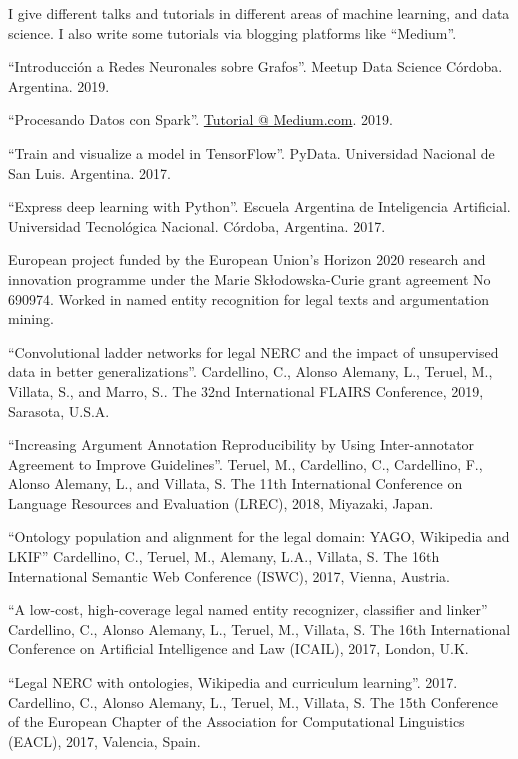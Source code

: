 \documentclass[]{deedy-resume-openfont}
\begin{document}
I give different talks and tutorials in different areas of machine learning,
and data science. I also write some tutorials via blogging platforms like ``Medium''.
\begin{tightemize}
\item ``Introducci\'on a Redes Neuronales sobre Grafos''. Meetup Data Science Córdoba. Argentina. 2019.
\item ``Procesando Datos con Spark''.
\href{https://medium.com/@crscardellino/procesando-datos-con-spark-48539d38e437}{Tutorial @ Medium.com}. 2019.
\item ``Train and visualize a model in TensorFlow''. PyData. Universidad 
Nacional de San Luis. Argentina. 2017.
\item ``Express deep learning with Python''. Escuela Argentina de 
Inteligencia Artificial. Universidad Tecnol\'ogica Nacional.
C\'ordoba, Argentina. 2017.
\end{tightemize}
\sectionsep

European project funded by the European Union's Horizon 2020 research and 
innovation programme under the Marie Sk\l{}odowska-Curie grant agreement No 
690974. Worked in named entity recognition for legal texts and argumentation
mining.
\begin{tightemize}
\item ``Convolutional ladder networks for legal NERC and the impact of unsupervised data
in better generalizations''. Cardellino, C., Alonso Alemany, L., Teruel, M., Villata, S.,
and Marro, S.. The 32nd International FLAIRS Conference, 2019, Sarasota, U.S.A.
\item ``Increasing Argument Annotation Reproducibility by Using Inter-annotator
Agreement to Improve Guidelines''. Teruel, M., Cardellino, C., 
Cardellino, F., Alonso Alemany, L., and Villata, S. The 11th International 
Conference on Language Resources and Evaluation (LREC), 2018, Miyazaki, Japan.
\item ``Ontology population and alignment for the legal domain: YAGO, Wikipedia and LKIF''
Cardellino, C., Teruel, M., Alemany, L.A., Villata, S. The 16th International
Semantic Web Conference (ISWC), 2017, Vienna, Austria.
\item ``A low-cost, high-coverage legal named entity recognizer, classifier and linker''
Cardellino, C., Alonso Alemany, L., Teruel, M., Villata, S. The 16th International 
Conference on Artificial Intelligence and Law (ICAIL), 2017, London, U.K.
\item ``Legal NERC with ontologies, Wikipedia and curriculum learning''. 2017.
Cardellino, C., Alonso Alemany, L., Teruel, M., Villata, S. The 15th Conference of the 
European Chapter of the Association for Computational Linguistics (EACL), 2017,
Valencia, Spain.
\end{tightemize}
\sectionsep
\end{document}
